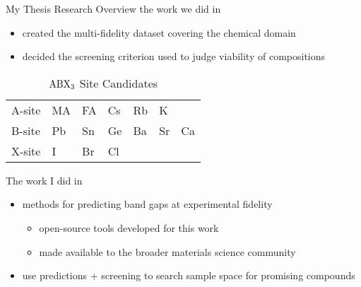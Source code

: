 \documentclass[10pt, aspectratio=169, presentation]{beamer}
\begin{document}
\begin{frame}[label={sec:org6205c80}]{My Thesis Research Overview}
the work we did in 
\begin{itemize}
\item created the multi-fidelity dataset covering the chemical domain
\item decided the screening criterion used to judge viability of compositions
\end{itemize}

\begin{table}[htbp]
\caption{\(\ce{ABX3}\) Site Candidates}
\centering
\begin{tabular}{l|llllll}
A-site & MA & FA & Cs & Rb & K & \\[0pt]
B-site & Pb & Sn & Ge & Ba & Sr & Ca\\[0pt]
X-site & I & Br & Cl &  &  & \\[0pt]
\end{tabular}
\end{table}

The work I did in 
\begin{itemize}
\item methods for predicting band gaps at experimental fidelity
\begin{itemize}
\item open-source tools developed for this work
\item made available to the broader materials science community
\end{itemize}
\item use predictions + screening to search sample space for promising compounds
\end{itemize}
\end{frame}
\end{document}
